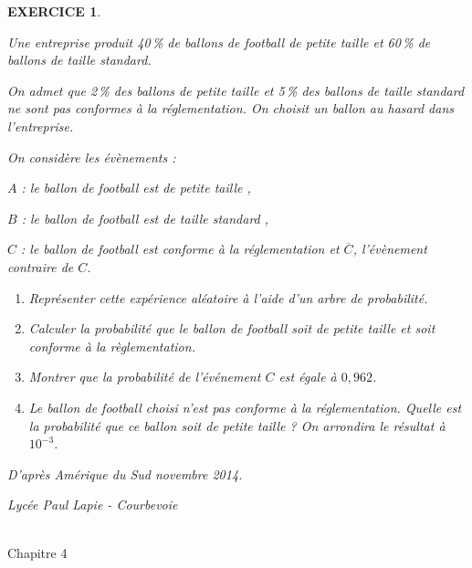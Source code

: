 \documentclass[a4paper]{article}   %
\renewcommand{\(}{\left(}
\renewcommand{\)}{\right)}
\newtheorem{EXO}{\large EXERCICE }
\newenvironment{EX}   { \setcounter{ques}{0} \begin{EXO} \hrulefill ~\vspace{0.3cm}

\normalfont}    {\end{EXO} \medskip}
\def\cl{{\large \bf{1èreG1}}}
\begin{document}
\begin{EX}
\medskip 

Une entreprise produit 40\,\% de ballons de football de petite taille et 60\,\% de ballons de taille standard. 

On admet que 2\,\% des ballons de petite taille et 5\,\% des ballons de taille standard ne sont pas conformes à la réglementation. On choisit un ballon au hasard dans l'entreprise. 

On considère les évènements : 

$A$ : \og le ballon de football est de petite taille \fg, 

$B$ : \og le ballon de football est de taille standard \fg, 

$C$ : \og le ballon de football est conforme à la réglementation\fg{} et $\overline{C}$, l'évènement contraire de $C$. 

\medskip

\begin{enumerate}
\item Représenter cette expérience aléatoire à l’aide d’un arbre de probabilité.
\item Calculer la probabilité que le ballon de football soit de petite taille et soit conforme à la règlementation.
\item Montrer que la probabilité de l'événement $C$ est égale à $0,962$.
\item Le ballon de football choisi n'est pas conforme à la réglementation. Quelle est la probabilité que ce ballon soit de petite taille ? On arrondira le résultat à $10^{- 3}$.
\end{enumerate}

\hfill \emph{D'après Amérique du Sud novembre 2014.} 
\end{EX}




\newpage \setcounter{EXO}{0} 
\def\dev{\Large Nombre dérivé et tangente à une courbe }

\noindent\begin{minipage}{.20\linewidth}\begin{center}                  
\noindent \emph{Lycée Paul Lapie - Courbevoie}
\end{center}\end{minipage}
\begin{minipage}{1.5\linewidth}\begin{center}	
\noindent \cl\\ Chapitre 4
\end{center}\end{minipage}
\end{document}
